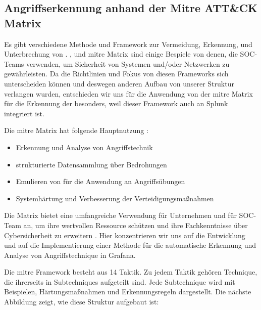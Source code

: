 \subsection{Angriffserkennung anhand der Mitre ATT\&CK Matrix\textregistered}
Es gibt verschiedene Methode und Framework zur Vermeidung, Erkennung, und Unterbrechung von . ,  und \gls{mitre} Matrix sind einige Bespiele von denen, die \gls{SOC}-Teams verwenden, um Sicherheit von Systemen und/oder Netzwerken zu gewährleisten. Da die Richtlinien und Fokus von diesen Frameworks sich unterscheiden können und deswegen anderen Aufbau von unserer Struktur verlangen wurden, entschieden wir uns für die Anwendung von der \gls{mitre} Matrix für die Erkennung der  besonders, weil dieser Framework auch an Splunk integriert ist.

Die \gls{mitre} Matrix hat folgende Hauptnutzung \citep{Mitre_Started}:

{
\begin{itemize}[noitemsep]
   \item Erkennung und Analyse von Angriffstechnik
   \item	strukturierte Datensammlung über Bedrohungen
   \item	Emulieren von  für die Anwendung an Angriffsübungen
   \item	Systemhärtung und Verbesserung der Verteidigungsmaßnahmen
\end{itemize}
}

Die Matrix bietet eine umfangreiche Verwendung für Unternehmen und für \gls{SOC}-Team an, um ihre wertvollen Ressource schützen und ihre Fachkenntnisse über \gls{Cybersicherheit} zu erweitern \citep{Hazel_howtousemitre}. Hier konzentrieren wir uns auf die Entwicklung und auf die Implementierung einer Methode für die automatische Erkennung und Analyse von Angriffstechnique in Grafana.

Die \gls{mitre} Framework besteht aus 14 Taktik. Zu jedem Taktik gehören Technique, die ihrerseits in Subtechniques aufgeteilt sind. Jede Subtechnique wird mit Beispielen, Härtungsmaßnahmen und Erkennungsregeln dargestellt. Die nächste Abbildung zeigt, wie diese Struktur aufgebaut ist: 

